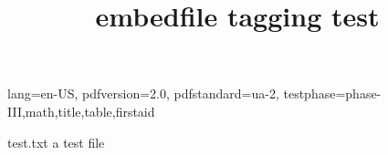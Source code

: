 \DocumentMetadata
  {
    lang=en-US,
    pdfversion=2.0,
    pdfstandard=ua-2,
    testphase={phase-III,math,title,table,firstaid}
  }
\begin{filecontents}{test.txt}
a test file
\end{filecontents}
\documentclass{article}
\usepackage{embedfile}

\title{embedfile tagging test}


text
